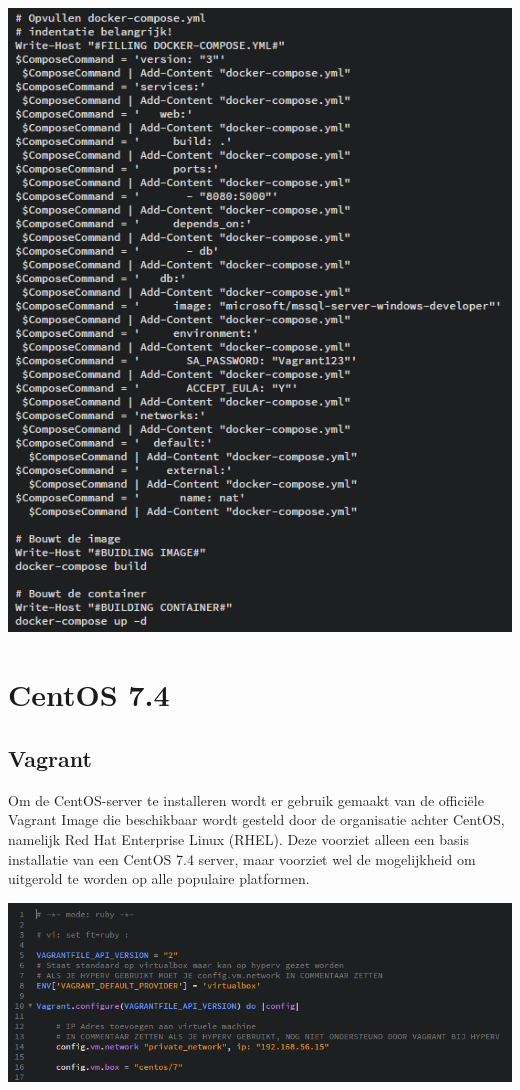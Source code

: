 \begin{center}
	\includegraphics[scale=0.6]{img/dockerfile02}
\end{center}

\section{CentOS 7.4}

\subsection{Vagrant}
Om de CentOS-server te installeren wordt er gebruik gemaakt van de officiële Vagrant Image die beschikbaar wordt gesteld door de organisatie achter CentOS, namelijk Red Hat Enterprise Linux (RHEL). Deze voorziet alleen een basis installatie van een CentOS 7.4 server, maar voorziet wel de mogelijkheid om uitgerold te worden op alle populaire platformen.

\begin{center}
	\includegraphics[scale=0.75]{img/centosvagrant01}
\end{center}


